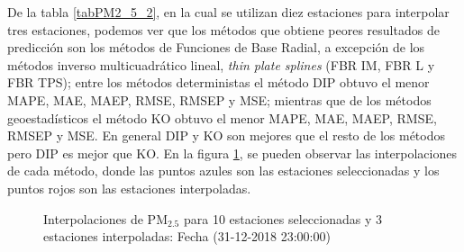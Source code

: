 De la tabla \ref{tabPM2_5_2}, en la cual se utilizan diez estaciones para interpolar tres estaciones, podemos ver que los métodos que obtiene peores resultados de predicción son los métodos de Funciones de Base Radial, a excepción de los métodos inverso multicuadrático lineal, {\em thin plate splines} (FBR IM, FBR L y FBR TPS); entre los métodos deterministas el método DIP obtuvo el menor MAPE, MAE, MAEP, RMSE, RMSEP y MSE; mientras que de los métodos geoestadísticos el método KO obtuvo el menor MAPE, MAE, MAEP, RMSE, RMSEP y MSE. En general DIP y KO son mejores que el resto de los métodos pero DIP es mejor que KO. En la figura \ref{PM25figure2}, se pueden observar las interpolaciones de cada método, donde las puntos azules son las estaciones seleccionadas y los puntos rojos son las estaciones interpoladas.


\begin{figure}[H]
\centering
{}
\subfigure[KO] {\texttt{[image: ./ok\_10\_6\_26302]}}
\subfigure[KU] {\texttt{[image: ./uk\_10\_6\_26302]}}
\caption{Interpolaciones de PM$_{2.5}$ para 10 estaciones seleccionadas y 3 estaciones interpoladas: Fecha (31-12-2018 23:00:00)}
\label{PM25figure2}
\end{figure}



